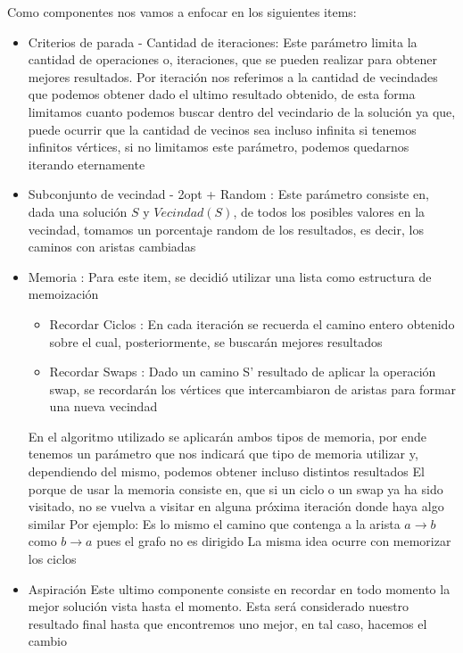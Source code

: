 \documentclass[10pt,a4paper]{article}
\begin{document}
Como componentes nos vamos a enfocar en los siguientes items:
\begin{itemize}
    \item Criterios de parada - Cantidad de iteraciones: Este parámetro limita la cantidad de operaciones o, iteraciones, que se pueden realizar para obtener mejores resultados. Por iteración nos referimos a la cantidad de vecindades que podemos obtener dado el ultimo resultado obtenido, de esta forma limitamos cuanto podemos buscar dentro del vecindario de la solución ya que, puede ocurrir que la cantidad de vecinos sea incluso infinita si tenemos infinitos vértices, si no limitamos este parámetro, podemos quedarnos iterando eternamente
    
    \item Subconjunto de vecindad - 2opt + Random : Este parámetro consiste en, dada una solución $S$ y $Vecindad(S)$, de todos los posibles valores en la vecindad, tomamos un porcentaje random de los resultados, es decir, los caminos con aristas cambiadas
    
    \item Memoria : Para este item, se decidió utilizar una lista como estructura de memoización
    \begin{itemize}
        \item Recordar Ciclos : En cada iteración se recuerda el camino entero obtenido sobre el cual, posteriormente, se buscarán mejores resultados
        \item Recordar Swaps : Dado un camino S' resultado de aplicar la operación swap, se recordarán los vértices que intercambiaron de aristas para formar una nueva vecindad
    \end{itemize}
    En el algoritmo utilizado se aplicarán ambos tipos de memoria, por ende tenemos un parámetro que nos indicará que tipo de memoria utilizar y, dependiendo del mismo, podemos obtener incluso distintos resultados
    El porque de usar la memoria consiste en, que si un ciclo o un swap ya ha sido visitado, no se vuelva a visitar en alguna próxima iteración donde haya algo similar
    Por ejemplo: Es lo mismo el camino que contenga a la arista $a\rightarrow b$ como $b \rightarrow a$ pues el grafo no es dirigido
    La misma idea ocurre con memorizar los ciclos
    
    \item Aspiración
    Este ultimo componente consiste en recordar en todo momento la mejor solución vista hasta el momento. Esta será considerado nuestro resultado final hasta que encontremos uno mejor, en tal caso, hacemos el cambio
    
\end{itemize}
\end{document}
